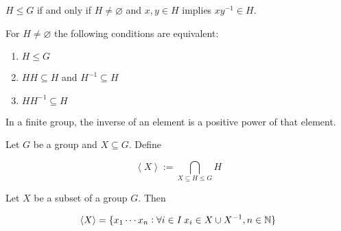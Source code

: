 \vspace{2mm}

\begin{proposition}
	$H \leq G$ if and only if $H \neq \varnothing$ and $x,y \in H$ implies $xy^{-1} \in H$.
\end{proposition}

\vspace{2mm}

\begin{proposition}
	For $H \neq \varnothing$ the following conditions are equivalent:
	
	\begin{enumerate}[label = (\arabic*)]
		\item $H \leq G$\\
		\item $HH \subseteq H$ and $H^{-1} \subseteq H$\\
		\item $HH^{-1} \subseteq H$
	\end{enumerate}
\end{proposition}

\vspace{2mm}

\begin{proposition}
	In a finite group, the inverse of an element is a positive power of that element.
\end{proposition}

\vspace{2mm}

\begin{definition}
	Let $G$ be a group and $X \subseteq G$. Define

	\begin{equation}
		\left\langle X \right\rangle := \bigcap_{X \subseteq H \leq G} H
	\end{equation}
\end{definition}

\vspace{2mm}

\begin{proposition}
	Let $X$ be a subset of a group $G$. Then 

	\begin{equation}
		\left\langle X \right\rangle = \cbr[0]{ x_1 \cdots x_n : \forall i \in I \> x_i \in X \cup X^{-1}, n \in \mathbb{N} }
	\end{equation}
\end{proposition}

\vspace{2mm}

